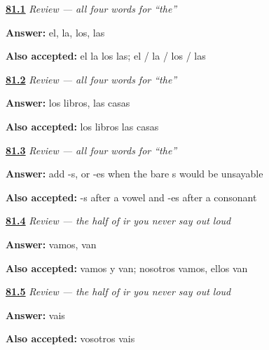 \noindent\begin{minipage}[t]{\linewidth}
\raggedright
\hyperlink{review-ES-C44-repaso-articulos-four}{\textbf{81.1}} \emph{Review — all four words for \textquotedblleft{}the\textquotedblright{}}\par
\small \textbf{Answer:} el, la, los, las\par
\footnotesize \textbf{Also accepted:} el la los las; el / la / los / las
\end{minipage}\par\medskip

\noindent\begin{minipage}[t]{\linewidth}
\raggedright
\hyperlink{review-ES-C44-repaso-articulos-grid}{\textbf{81.2}} \emph{Review — all four words for \textquotedblleft{}the\textquotedblright{}}\par
\small \textbf{Answer:} los libros, las casas\par
\footnotesize \textbf{Also accepted:} los libros las casas
\end{minipage}\par\medskip

\noindent\begin{minipage}[t]{\linewidth}
\raggedright
\hyperlink{review-ES-C44-repaso-articulos-rule}{\textbf{81.3}} \emph{Review — all four words for \textquotedblleft{}the\textquotedblright{}}\par
\small \textbf{Answer:} add -s, or -es when the bare s would be unsayable\par
\footnotesize \textbf{Also accepted:} -s after a vowel and -es after a consonant
\end{minipage}\par\medskip

\noindent\begin{minipage}[t]{\linewidth}
\raggedright
\hyperlink{review-ES-C44-repaso-ir-ida-plural}{\textbf{81.4}} \emph{Review — the half of \emph{ir} you never say out loud}\par
\small \textbf{Answer:} vamos, van\par
\footnotesize \textbf{Also accepted:} vamos y van; nosotros vamos, ellos van
\end{minipage}\par\medskip

\noindent\begin{minipage}[t]{\linewidth}
\raggedright
\hyperlink{review-ES-C44-repaso-ir-ida-vosotros}{\textbf{81.5}} \emph{Review — the half of \emph{ir} you never say out loud}\par
\small \textbf{Answer:} vais\par
\footnotesize \textbf{Also accepted:} vosotros vais
\end{minipage}\par\medskip

